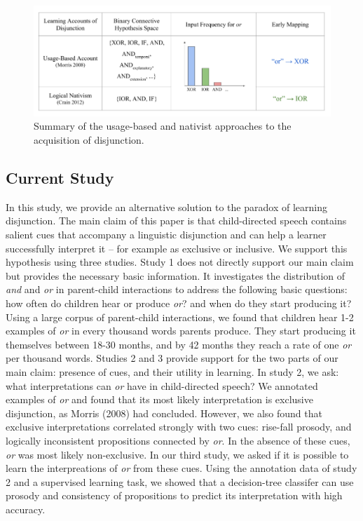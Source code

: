 \documentclass[,man,floatsintext]{apa6}
\begin{document}
\begin{figure}[tb]

{\centering \includegraphics{figs/theories-1} 

}

\caption{Summary of the usage-based and nativist approaches to the acquisition of disjunction.}\label{fig:theories}
\end{figure}

\hypertarget{current-study}{%
\subsection{Current Study}\label{current-study}}

In this study, we provide an alternative solution to the paradox of learning disjunction. The main claim of this paper is that child-directed speech contains salient cues that accompany a linguistic disjunction and can help a learner successfully interpret it -- for example as exclusive or inclusive. We support this hypothesis using three studies. Study 1 does not directly support our main claim but provides the necessary basic information. It investigates the distribution of \emph{and} and \emph{or} in parent-child interactions to address the following basic questions: how often do children hear or produce \emph{or}? and when do they start producing it? Using a large corpus of parent-child interactions, we found that children hear 1-2 examples of \emph{or} in every thousand words parents produce. They start producing it themselves between 18-30 months, and by 42 months they reach a rate of one \emph{or} per thousand words. Studies 2 and 3 provide support for the two parts of our main claim: presence of cues, and their utility in learning. In study 2, we ask: what interpretations can \emph{or} have in child-directed speech? We annotated examples of \emph{or} and found that its most likely interpretation is exclusive disjunction, as Morris (2008) had concluded. However, we also found that exclusive interpretations correlated strongly with two cues: rise-fall prosody, and logically inconsistent propositions connected by \emph{or}. In the absence of these cues, \emph{or} was most likely non-exclusive. In our third study, we asked if it is possible to learn the interpreations of \emph{or} from these cues. Using the annotation data of study 2 and a supervised learning task, we showed that a decision-tree classifer can use prosody and consistency of propositions to predict its interpretation with high accuracy.
\end{document}
